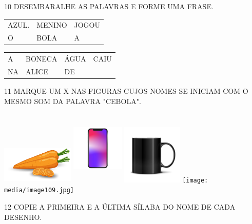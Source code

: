 \num{10} DESEMBARALHE AS PALAVRAS E FORME UMA FRASE.

\begin{longtable}[]{@{}lll@{}}
\toprule
AZUL. & MENINO & JOGOU\tabularnewline
O & BOLA & A\tabularnewline
\bottomrule
\end{longtable}


\begin{longtable}[]{@{}llll@{}}
\toprule
A & BONECA & ÁGUA & CAIU\tabularnewline
NA & ALICE & DE\tabularnewline
\bottomrule
\end{longtable}


\num{11} MARQUE UM X NAS FIGURAS CUJOS NOMES SE INICIAM COM O MESMO SOM DA PALAVRA "CEBOLA".


\includegraphics[width=1.36272in,height=0.72875in]{media/image105.jpg}
\includegraphics[width=0.98256in,height=1.40209in]{media/image107.jpg}
\includegraphics[width=1.12500in,height=1.12500in]{media/image108.jpg}
\texttt{[image: media/image109.jpg]}


\num{12} COPIE A PRIMEIRA E A ÚLTIMA SÍLABA DO NOME DE CADA DESENHO.\bigskip


